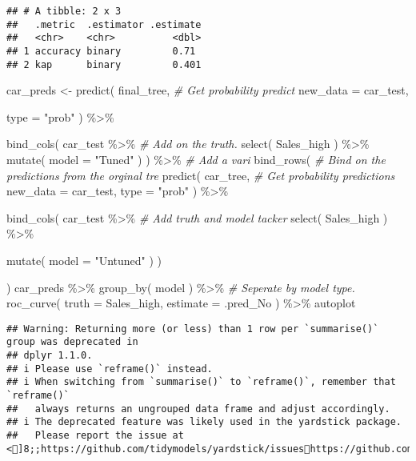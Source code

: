 \documentclass[
]{article}
\newenvironment{Shaded}{\begin{snugshade}}{\end{snugshade}}
\newcommand{\AttributeTok}[1]{\textcolor[rgb]{0.77,0.63,0.00}{#1}}
\newcommand{\CommentTok}[1]{\textcolor[rgb]{0.56,0.35,0.01}{\textit{#1}}}
\newcommand{\FunctionTok}[1]{\textcolor[rgb]{0.00,0.00,0.00}{#1}}
\newcommand{\NormalTok}[1]{#1}
\newcommand{\OtherTok}[1]{\textcolor[rgb]{0.56,0.35,0.01}{#1}}
\newcommand{\SpecialCharTok}[1]{\textcolor[rgb]{0.00,0.00,0.00}{#1}}
\newcommand{\StringTok}[1]{\textcolor[rgb]{0.31,0.60,0.02}{#1}}
\begin{document}
\begin{verbatim}
## # A tibble: 2 x 3
##   .metric  .estimator .estimate
##   <chr>    <chr>          <dbl>
## 1 accuracy binary         0.71 
## 2 kap      binary         0.401
\end{verbatim}

\begin{Shaded}
\begin{Highlighting}[]
\NormalTok{car\_preds }\OtherTok{\textless{}{-}} \FunctionTok{predict}\NormalTok{( final\_tree, }\CommentTok{\# Get probability predict }
                      \AttributeTok{new\_data =}\NormalTok{ car\_test,}

\AttributeTok{type =} \StringTok{"prob"}\NormalTok{ ) }\SpecialCharTok{\%\textgreater{}\%}

\FunctionTok{bind\_cols}\NormalTok{( car\_test }\SpecialCharTok{\%\textgreater{}\%} \CommentTok{\# Add on the truth.}
  \FunctionTok{select}\NormalTok{( Sales\_high ) }\SpecialCharTok{\%\textgreater{}\%} 
    \FunctionTok{mutate}\NormalTok{( }\AttributeTok{model =} \StringTok{"Tuned"}\NormalTok{ ) ) }\SpecialCharTok{\%\textgreater{}\%} \CommentTok{\# Add a vari }
\FunctionTok{bind\_rows}\NormalTok{( }\CommentTok{\# Bind on the predictions from the orginal tre }
  \FunctionTok{predict}\NormalTok{( car\_tree, }\CommentTok{\# Get probability predictions }
           \AttributeTok{new\_data =}\NormalTok{ car\_test,}
            \AttributeTok{type =} \StringTok{"prob"}\NormalTok{ ) }\SpecialCharTok{\%\textgreater{}\%}

  \FunctionTok{bind\_cols}\NormalTok{( car\_test }\SpecialCharTok{\%\textgreater{}\%} \CommentTok{\# Add truth and model tacker }
               \FunctionTok{select}\NormalTok{( Sales\_high ) }\SpecialCharTok{\%\textgreater{}\%}

    \FunctionTok{mutate}\NormalTok{( }\AttributeTok{model =} \StringTok{"Untuned"}\NormalTok{ ) )}

\NormalTok{) }
\NormalTok{car\_preds }\SpecialCharTok{\%\textgreater{}\%} \FunctionTok{group\_by}\NormalTok{( model ) }\SpecialCharTok{\%\textgreater{}\%} \CommentTok{\# Seperate by model type. }
  \FunctionTok{roc\_curve}\NormalTok{( }\AttributeTok{truth =}\NormalTok{ Sales\_high, }\AttributeTok{estimate =}\NormalTok{ .pred\_No ) }\SpecialCharTok{\%\textgreater{}\%}\NormalTok{ autoplot}
\end{Highlighting}
\end{Shaded}

\begin{verbatim}
## Warning: Returning more (or less) than 1 row per `summarise()` group was deprecated in
## dplyr 1.1.0.
## i Please use `reframe()` instead.
## i When switching from `summarise()` to `reframe()`, remember that `reframe()`
##   always returns an ungrouped data frame and adjust accordingly.
## i The deprecated feature was likely used in the yardstick package.
##   Please report the issue at <]8;;https://github.com/tidymodels/yardstick/issueshttps://github.com/tidymodels/yardstick/issues]8;;>.
\end{verbatim}
\end{document}
